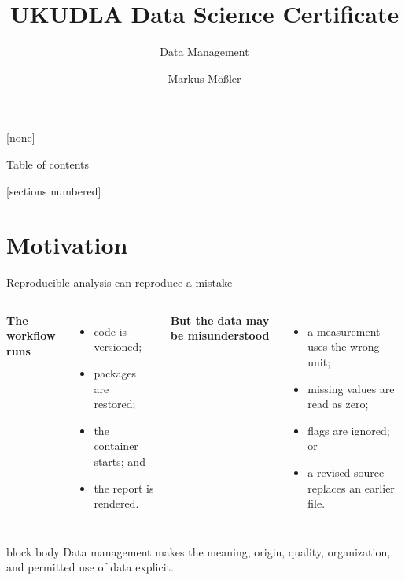 \documentclass[10pt,aspectratio=169]{beamer}
\title{UKUDLA Data Science Certificate}
\subtitle{Data Management}
\author{Markus Mößler}
\institute{University of Hohenheim}
\begin{document}
\maketitle

{
[none]

\begin{frame}[noframenumbering]{Table of contents}

  \small
  [sections numbered]
  \tableofcontents[hideallsubsections]

\end{frame}
}



\section{Motivation}


\begin{frame}{Reproducible analysis can reproduce a mistake}

\small

\begin{columns}[T]


\textbf{The workflow runs}

\begin{itemize}
  \item code is versioned;
  \item packages are restored;
  \item the container starts; and
  \item the report is rendered.
\end{itemize}


\textbf{But the data may be misunderstood}

\begin{itemize}
  \item a measurement uses the wrong unit;
  \item missing values are read as zero;
  \item flags are ignored; or
  \item a revised source replaces an earlier file.
\end{itemize}

\end{columns}

\vspace{0.35cm}

\begin{beamercolorbox}[rounded=true,sep=8pt]{block body}
Data management makes the meaning, origin, quality, organization, and permitted use of data explicit.
\end{beamercolorbox}

\end{frame}
\end{document}
